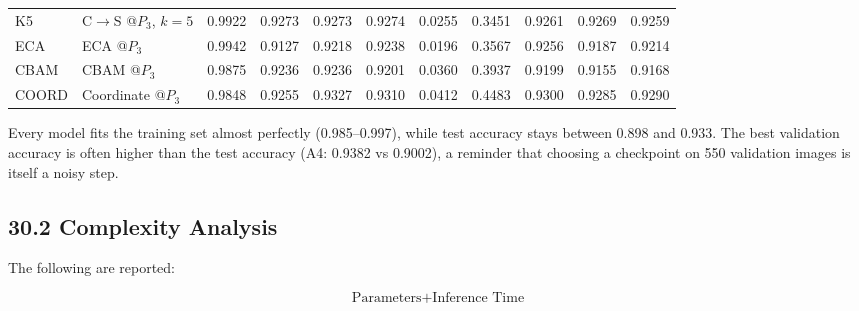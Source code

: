 \documentclass[10pt]{article}
\begin{document}
\begin{center}
{\begin{tabular}{|l|l|c|c|c|c|c|c|c|c|c|}
K5 & C$\rightarrow$S @$P_3$, $k=5$ & 0.9922 & 0.9273 & 0.9273 & 0.9274 & 0.0255 & 0.3451 & 0.9261 & 0.9269 & 0.9259\\
ECA & ECA @$P_3$ & 0.9942 & 0.9127 & 0.9218 & 0.9238 & 0.0196 & 0.3567 & 0.9256 & 0.9187 & 0.9214\\
CBAM & CBAM @$P_3$ & 0.9875 & 0.9236 & 0.9236 & 0.9201 & 0.0360 & 0.3937 & 0.9199 & 0.9155 & 0.9168\\
COORD & Coordinate @$P_3$ & 0.9848 & 0.9255 & 0.9327 & 0.9310 & 0.0412 & 0.4483 & 0.9300 & 0.9285 & 0.9290\\
\hline
\end{tabular}}
\end{center}

Every model fits the training set almost perfectly (0.985--0.997), while test
accuracy stays between 0.898 and 0.933. The best validation accuracy is often
higher than the test accuracy (A4: 0.9382 vs 0.9002), a reminder that choosing a
checkpoint on 550 validation images is itself a noisy step.

\subsection*{30.2 Complexity Analysis}

The following are reported:

\[
\boxed{
\text{Parameters}
+
\text{Inference Time}
}
\]
\end{document}
